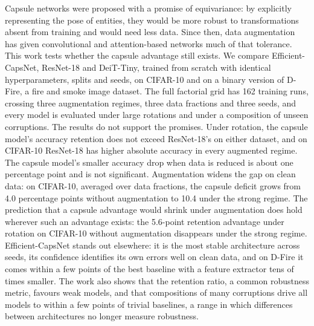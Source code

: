 Capsule networks were proposed with a promise of equivariance: by explicitly representing the pose of entities, they would be more robust to transformations absent from training and would need less data. Since then, data augmentation has given convolutional and attention-based networks much of that tolerance. This work tests whether the capsule advantage still exists. We compare Efficient-CapsNet, ResNet-18 and DeiT-Tiny, trained from scratch with identical hyperparameters, splits and seeds, on CIFAR-10 and on a binary version of D-Fire, a fire and smoke image dataset. The full factorial grid has 162 training runs, crossing three augmentation regimes, three data fractions and three seeds, and every model is evaluated under large rotations and under a composition of unseen corruptions. The results do not support the promises. Under rotation, the capsule model's accuracy retention does not exceed ResNet-18's on either dataset, and on CIFAR-10 ResNet-18 has higher absolute accuracy in every augmented regime. The capsule model's smaller accuracy drop when data is reduced is about one percentage point and is not significant. Augmentation widens the gap on clean data: on CIFAR-10, averaged over data
fractions, the capsule deficit grows from 4.0 percentage points without
augmentation to 10.4 under the strong regime. The prediction that a capsule
advantage would shrink under augmentation does hold wherever such an advantage
exists: the 5.6-point retention advantage under rotation on CIFAR-10 without
augmentation disappears under the strong regime. Efficient-CapsNet stands out elsewhere: it is the most stable architecture across seeds, its confidence identifies its own errors well on clean data, and on D-Fire it comes within a few points of the best baseline with a feature extractor tens of times smaller. The work also shows that the retention ratio, a common robustness metric, favours weak models, and that compositions of many corruptions drive all models to within a few
points of trivial baselines, a range in which differences between architectures
no longer measure robustness.